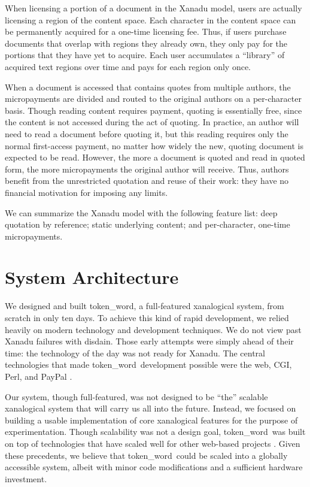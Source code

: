 \documentclass{acm_proc_article-sp}
\newcommand{\tw}{token\_word}
\begin{document}
When licensing a portion of a document in the Xanadu model, users are actually licensing a region of the content space.
Each character in the content space can be permanently acquired for a one-time licensing fee.
Thus, if users purchase documents that overlap with regions they already own, they only pay for the portions that they have yet to acquire.
Each user accumulates a ``library'' of acquired text regions over time and pays for each region only once.

When a document is accessed that contains quotes from multiple authors, the micropayments are divided and routed to the original authors on a per-character basis. 
Though reading content requires payment, quoting is essentially free, since the content is not accessed during the act of quoting.
In practice, an author will need to read a document before quoting it, but this reading requires only the normal first-access payment, no matter how widely the new, quoting document is expected to be read.
However, the more a document is quoted and read in quoted form, the more micropayments the original author will receive.
Thus, authors benefit from the unrestricted quotation and reuse of their work:  they have no financial motivation for imposing any limits.

We can summarize the Xanadu model with the following feature list:  deep quotation by reference; static underlying content; and per-character, one-time micropayments.


\section{System Architecture}
We designed and built \tw, a full-featured xanalogical system, from scratch in only ten days.
To achieve this kind of rapid development, we relied heavily on modern technology and development techniques.
We do not view past Xanadu failures with disdain.
Those early attempts were simply ahead of their time:  the technology of the day was not ready for Xanadu.
The central technologies that made \tw \   development possible were the web, CGI, Perl, and PayPal \cite{paypal}.

Our system, though full-featured, was not designed to be ``the'' scalable xanalogical system that will carry us all into the future.
Instead, we focused on building a usable implementation of core xanalogical features for the purpose of experimentation.
Though scalability was not a design goal, \tw \  was built on top of technologies that have scaled well for other web-based projects \cite{Everything2, WikiWikiWeb, Wikipedia}.
Given these precedents, we believe that \tw \   could be scaled into a globally accessible system, albeit with minor code modifications and a sufficient hardware investment. 
\end{document}
